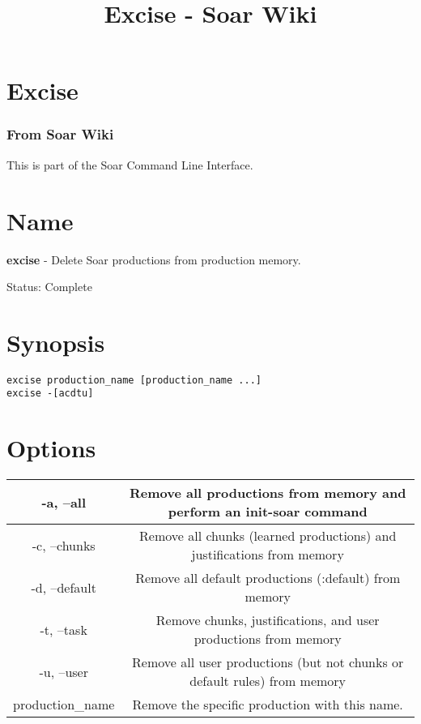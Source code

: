 \documentclass[10pt]{article}
\title{Excise - Soar Wiki}
\begin{document}
\section*{Excise}
\subsubsection*{From Soar Wiki}


 This is part of the Soar Command Line Interface. 
\section*{ Name }


 \textbf{excise}
 - Delete Soar productions from production memory. 


 Status: Complete
\section*{ Synopsis }


  \begin{verbatim}
excise production_name [production_name ...]
excise -[acdtu]

\end{verbatim}



 
\section*{ Options }


\begin{tabular}{|c|c|}
\hline 
 -a, --all  & Remove all productions from memory and perform an init-soar command  \\
 \hline 
 -c, --chunks  & Remove all chunks (learned productions) and justifications from memory  \\
 \hline 
 -d, --default  & Remove all default productions (:default) from memory  \\
 \hline 
 -t, --task  & Remove chunks, justifications, and user productions from memory  \\
 \hline 
 -u, --user  & Remove all user productions (but not chunks or default rules) from memory  \\
 \hline 
production\_name & Remove the specific production with this name.  \\
 \hline 

\end{tabular}
\end{document}
